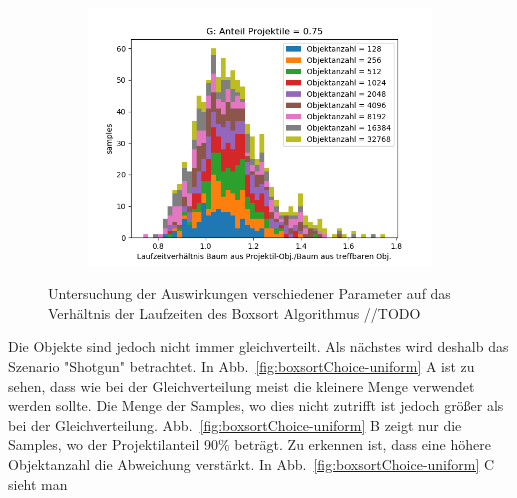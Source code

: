 \begin{figure}
\begin{subfigure}[t]{0.55\textwidth}
		\label{fig:boxsortChoice-shotgun-F}
	\end{subfigure}
~
	\begin{subfigure}[t]{0.55\textwidth}
		\centering
		\includegraphics[width=1\textwidth]{./res/boxsortChoice-shotgun-G.png}

		\label{fig:boxsortChoice-shotgun-G}
	\end{subfigure}

	\caption{Untersuchung der Auswirkungen verschiedener Parameter auf das Verhältnis der Laufzeiten des Boxsort Algorithmus //TODO}
	\label{fig:boxsortChoice-shotgun}
\end{figure}

Die Objekte sind jedoch nicht immer gleichverteilt. Als nächstes wird deshalb das Szenario "Shotgun" betrachtet. In Abb.~\ref{fig:boxsortChoice-uniform} A ist zu sehen, dass wie bei der Gleichverteilung meist die kleinere Menge verwendet werden sollte. Die Menge der Samples, wo dies nicht zutrifft ist jedoch größer als bei der Gleichverteilung. Abb.~\ref{fig:boxsortChoice-uniform} B zeigt nur die Samples, wo der Projektilanteil 90\% beträgt. Zu erkennen ist, dass eine höhere Objektanzahl die Abweichung verstärkt. In Abb.~\ref{fig:boxsortChoice-uniform} C sieht man\\

